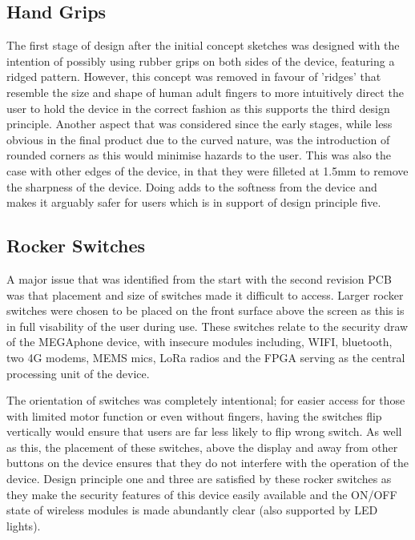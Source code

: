 \subsection{Hand Grips}

The first stage of design after the initial concept sketches was designed with the intention of possibly using rubber grips on both sides of the device, featuring a ridged pattern.
However, this concept was removed in favour of 'ridges' that resemble the size and shape of human adult fingers to more intuitively direct the user to hold the device in the correct fashion as this supports the third design principle.
Another aspect that was considered since the early stages, while less obvious in the final product due to the curved nature, was the introduction of rounded corners as this would minimise hazards to the user.
This was also the case with other edges of the device, in that they were filleted at 1.5mm to remove the sharpness of the device.
Doing adds to the softness from the device and makes it arguably safer for users which is in support of design principle five.

\subsection{Rocker Switches}

A major issue that was identified from the start with the second revision PCB was that placement and size of switches made it difficult to access.
Larger rocker switches were chosen to be placed on the front surface above the screen as this is in full visability of the user during use.
These switches relate to the security draw of the MEGAphone device, with insecure modules including, WIFI, bluetooth, two 4G modems, MEMS mics, LoRa radios and the FPGA serving as the central processing unit of the device.

The orientation of switches was completely intentional; for easier access for those with limited motor function or even without fingers, having the switches flip vertically would ensure that users are far less likely to flip wrong switch.
As well as this, the placement of these switches, above the display and away from other buttons on the device ensures that they do not interfere with the operation of the device.
Design principle one and three are satisfied by these rocker switches as they make the security features of this device easily available and the ON/OFF state of wireless modules is made abundantly clear (also supported by LED lights).

